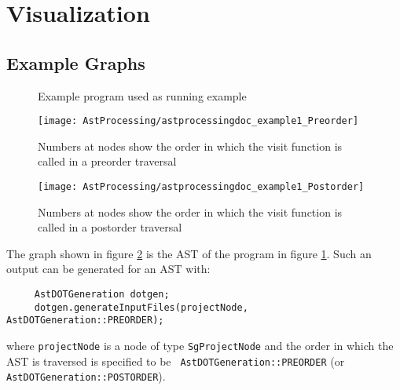 \section{Visualization}

\subsection{Example Graphs}

\begin{figure}
\begin{latexonly}
   
\end{latexonly}

\begin{htmlonly}
   
\end{htmlonly}
\caption{Example program used as running example}
\label{AstProcessing:example1}
\end{figure}

\begin{figure}
\texttt{[image: AstProcessing/astprocessingdoc\_example1\_Preorder]}
\caption{Numbers at nodes show the order in which the visit function is called in a preorder traversal}
\label{AstProcessing:PreorderAst}
\end{figure}

\begin{figure}
\texttt{[image: AstProcessing/astprocessingdoc\_example1\_Postorder]}
\caption{Numbers at nodes show the order in which the visit function is called in a postorder traversal}
\label{introduction:PostorderAst}
\end{figure}

The graph shown in figure \ref{AstProcessing:PreorderAst} is the AST of
the program in figure \ref{AstProcessing:example1}. Such an output can
be generated for an AST with:

{\indent
{\mySmallFontSize
\begin{verbatim}
     AstDOTGeneration dotgen;
     dotgen.generateInputFiles(projectNode, AstDOTGeneration::PREORDER);
\end{verbatim}
}}
where {\tt projectNode} is a node of type {\tt SgProjectNode} and the
order in which the AST is traversed is specified to be {\tt
AstDOTGeneration::PREORDER} (or {\tt AstDOTGeneration::POSTORDER}).

